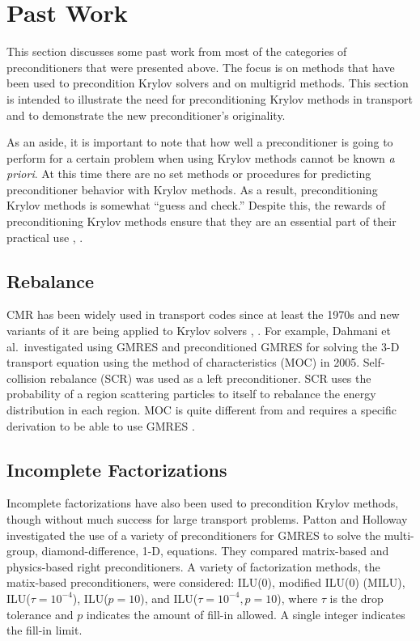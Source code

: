 \section{Past Work}
This section discusses some past work from most of the categories of preconditioners that were presented above. The focus is on methods that have been used to precondition Krylov solvers and on multigrid methods. This section is intended to illustrate the need for preconditioning Krylov methods in transport and to demonstrate the new preconditioner's originality. 

As an aside, it is important to note that how well a preconditioner is going to perform for a certain problem when using Krylov methods cannot be known \emph{a priori}. At this time there are no set methods or procedures for predicting preconditioner behavior with Krylov methods. As a result, preconditioning Krylov methods is somewhat ``guess and check.'' Despite this, the rewards of preconditioning Krylov methods ensure that they are an essential part of their practical use \cite{Knoll2004}, \cite{Benzi2002}. 

\subsection{Rebalance}
CMR has been widely used in transport codes since at least the 1970s and new variants of it are being applied to Krylov solvers \cite{Dahmani2002}, \cite{Yamamoto2005}. For example, Dahmani et al.\ investigated using GMRES and preconditioned GMRES for solving the 3-D transport equation using the method of characteristics (MOC) in 2005. Self-collision rebalance (SCR) was used as a left preconditioner. SCR uses the probability of a region scattering particles to itself to rebalance the energy distribution in each region. MOC is quite different from \Sn and requires a specific derivation to be able to use GMRES \cite{Dahmani2002}. 

\subsection{Incomplete Factorizations}
Incomplete factorizations have also been used to precondition Krylov methods, though without much success for large transport problems. Patton and Holloway investigated the use of a variety of preconditioners for GMRES to solve the multi-group, diamond-difference, 1-D, \Sn equations. They compared matrix-based and physics-based right preconditioners. A variety of factorization methods, the matix-based preconditioners, were considered: ILU(0), modified ILU(0) (MILU), ILU($\tau=10^{-4}$), ILU($p=10$), and ILU($\tau=10^{-4}, p=10$), where $\tau$ is the drop tolerance and $p$ indicates the amount of fill-in allowed. A single integer indicates the fill-in limit. 

